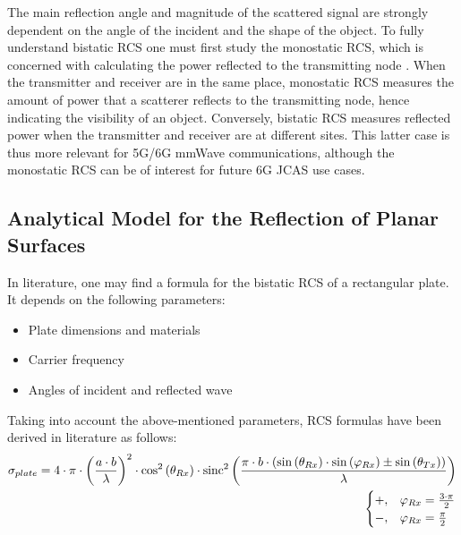 The main reflection angle and magnitude of the scattered signal are strongly dependent on the angle of the incident and the shape of the object. To fully understand bistatic RCS one must first study the monostatic RCS, which is concerned with calculating the power reflected to the transmitting node \cite{RCS_3}. When the transmitter and receiver are in the same place, monostatic RCS measures the amount of power that a scatterer reflects to the transmitting node, hence indicating the visibility of an object. Conversely, bistatic RCS measures reflected power when the transmitter and receiver are at different sites. This latter case is thus more relevant for 5G/6G mmWave communications, although the monostatic RCS can be of interest for future 6G \ac{JCAS} use cases.
\subsection{Analytical Model for the Reflection of Planar Surfaces} \label{Analytical Model for the Reflection of Planar Surfaces}
In literature, one may find a formula for the bistatic RCS of a rectangular plate. It depends on the following parameters:
\begin{itemize}
	\item Plate dimensions and materials
	\item Carrier frequency
	\item Angles of incident and reflected wave
\end{itemize}
Taking into account the above-mentioned parameters, RCS formulas have been derived in literature \cite{Helios, Kerr1989PropagationOS, Balanis} as follows:
\begin{equation} \label{RCS_flatplate}
	\begin{aligned}
	\sigma_{plate} = 4 \cdot \pi \cdot \left( \frac{a \cdot b}{\lambda} \right)^2 \cdot \cos^2 \left( \theta_{Rx} \right) \cdot \operatorname{sinc}^2 \left( \frac{\pi \cdot b \cdot \left( \sin \left(\theta_{Rx} \right) \cdot \sin \left( \varphi_{Rx} \right) \pm \sin \left( \theta_{Tx} \right) \right) }{\lambda} \right) \\
			\begin{cases}
		+, & \varphi_{Rx}= \frac{3\cdot \pi}{2} \\
		-,  & \varphi_{Rx}= \frac{\pi}{2}
	\end{cases} 
	\end{aligned}
\end{equation}

